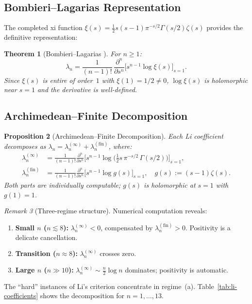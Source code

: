 \documentclass[12pt,a4paper]{article}
\newtheorem{theorem}{Theorem}[section]
\newtheorem{proposition}[theorem]{Proposition}
\theoremstyle{definition}
\theoremstyle{remark}
\newtheorem{remark}[theorem]{Remark}
\begin{document}
\subsection{Bombieri--Lagarias Representation}

The completed xi function $\xi(s) = \frac{1}{2}s(s-1)\pi^{-s/2}\Gamma(s/2)\zeta(s)$ provides the definitive representation:

\begin{theorem}[Bombieri--Lagarias \cite{BombieriLagarias1999}]
\label{thm:bombieri-lagarias}
For $n \geq 1$:
\[
\lambda_n = \frac{1}{(n-1)!}\,\frac{\partial^n}{\partial s^n}\Big[s^{n-1}\log\xi(s)\Big]_{s=1}.
\]
Since $\xi(s)$ is entire of order~$1$ with $\xi(1) = 1/2 \neq 0$, $\log\xi(s)$ is holomorphic near $s = 1$ and the derivative is well-defined.
\end{theorem}

\subsection{Archimedean--Finite Decomposition}

\begin{proposition}[Archimedean--Finite Decomposition]
\label{prop:decomposition}
Each Li coefficient decomposes as $\lambda_n = \lambda_n^{(\infty)} + \lambda_n^{(\mathrm{fin})}$, where:
\begin{align}
\lambda_n^{(\infty)} &= \frac{1}{(n-1)!}\frac{\partial^n}{\partial s^n}\Big[s^{n-1}\log\!\big(\tfrac{1}{2}s\,\pi^{-s/2}\,\Gamma(s/2)\big)\Big]_{s=1}, \label{eq:arch-part} \\
\lambda_n^{(\mathrm{fin})} &= \frac{1}{(n-1)!}\frac{\partial^n}{\partial s^n}\Big[s^{n-1}\log g(s)\Big]_{s=1}, \quad g(s) := (s-1)\zeta(s). \label{eq:fin-part}
\end{align}
Both parts are individually computable; $g(s)$ is holomorphic at $s=1$ with $g(1) = 1$.
\end{proposition}

\begin{remark}[Three-regime structure]
\label{rem:three-regime}
Numerical computation reveals:
\begin{enumerate}[label=(\alph*)]
  \item \textbf{Small $n$ ($n \lesssim 8$):} $\lambda_n^{(\infty)} < 0$, compensated by $\lambda_n^{(\mathrm{fin})} > 0$. Positivity is a delicate cancellation.
  \item \textbf{Transition ($n \approx 8$):} $\lambda_n^{(\infty)}$ crosses zero.
  \item \textbf{Large $n$ ($n \gg 10$):} $\lambda_n^{(\infty)} \sim \frac{n}{2}\log n$ dominates; positivity is automatic.
\end{enumerate}
The ``hard'' instances of Li's criterion concentrate in regime~(a). Table~\ref{tab:li-coefficients} shows the decomposition for $n = 1, \ldots, 13$.
\end{remark}
\end{document}
